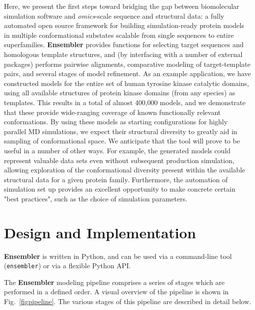\documentclass[aps,pre,twocolumn,nofootinbib,superscriptaddress,linenumbers]{revtex4-1}
\begin{document}
Here, we present the first steps toward bridging the gap between biomolecular simulation software and \emph{omics}-scale sequence and structural data: a fully automated open source framework for building simulation-ready protein models in multiple conformational substates scalable from single sequences to entire superfamilies.
{\bf Ensembler} provides functions for selecting target sequences and homologous template structures, and (by interfacing with a number of external packages) performs pairwise alignments, comparative modeling of target-template pairs, and several stages of model refinement.
As an example application, we have constructed models for the entire set of human tyrosine kinase catalytic domains, using all available structures of protein kinase domains (from any species) as templates.
This results in a total of almost 400,000 models, and we demonstrate that these provide wide-ranging coverage of known functionally relevant conformations.
By using these models as starting configurations for highly parallel MD simulations, we expect their structural diversity to greatly aid in sampling of conformational space.
We anticipate that the tool will prove to be useful in a number of other ways.
For example, the generated models could represent valuable data sets even without subsequent production simulation, allowing exploration of the conformational diversity present within the available structural data for a given protein family.
Furthermore, the automation of simulation set up provides an excellent opportunity to make concrete certain "best practices", such as the choice of simulation parameters.

\section{Design and Implementation}

{\bf Ensembler} is written in Python, and can be used via a command-line tool ({\tt ensembler}) or via a flexible Python API.

The {\bf Ensembler} modeling pipeline comprises a series of stages which are performed in a defined order. 
A visual overview of the pipeline is shown in Fig.~\ref{figpipeline}.
The various stages of this pipeline are described in detail below.
\end{document}
